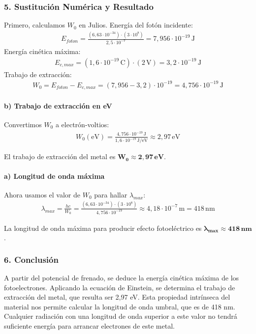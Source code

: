 \subsubsection*{5. Sustitución Numérica y Resultado}
Primero, calculamos $W_0$ en Julios.
Energía del fotón incidente:
\begin{gather}
    E_{foton} = \frac{(6,63 \cdot 10^{-34}) \cdot (3 \cdot 10^8)}{2,5 \cdot 10^{-7}} = 7,956 \cdot 10^{-19} \, \text{J}
\end{gather}
Energía cinética máxima:
\begin{gather}
    E_{c,max} = (1,6 \cdot 10^{-19} \, \text{C}) \cdot (2 \, \text{V}) = 3,2 \cdot 10^{-19} \, \text{J}
\end{gather}
Trabajo de extracción:
\begin{gather}
    W_0 = E_{foton} - E_{c,max} = (7,956 - 3,2) \cdot 10^{-19} = 4,756 \cdot 10^{-19} \, \text{J}
\end{gather}
\paragraph*{b) Trabajo de extracción en eV}
Convertimos $W_0$ a electrón-voltios:
\begin{gather}
    W_0 (\text{eV}) = \frac{4,756 \cdot 10^{-19} \, \text{J}}{1,6 \cdot 10^{-19} \, \text{J/eV}} \approx 2,97 \, \text{eV}
\end{gather}
\begin{cajaresultado}
    El trabajo de extracción del metal es $\boldsymbol{W_0 \approx 2,97 \, \textbf{eV}}$.
\end{cajaresultado}
\paragraph*{a) Longitud de onda máxima}
Ahora usamos el valor de $W_0$ para hallar $\lambda_{max}$:
\begin{gather}
    \lambda_{max} = \frac{hc}{W_0} = \frac{(6,63 \cdot 10^{-34}) \cdot (3 \cdot 10^8)}{4,756 \cdot 10^{-19}} \approx 4,18 \cdot 10^{-7} \, \text{m} = 418 \, \text{nm}
\end{gather}
\begin{cajaresultado}
    La longitud de onda máxima para producir efecto fotoeléctrico es $\boldsymbol{\lambda_{max} \approx 418 \, \textbf{nm}}$.
\end{cajaresultado}

\subsubsection*{6. Conclusión}
\begin{cajaconclusion}
A partir del potencial de frenado, se deduce la energía cinética máxima de los fotoelectrones. Aplicando la ecuación de Einstein, se determina el trabajo de extracción del metal, que resulta ser 2,97 eV. Esta propiedad intrínseca del material nos permite calcular la longitud de onda umbral, que es de 418 nm. Cualquier radiación con una longitud de onda superior a este valor no tendrá suficiente energía para arrancar electrones de este metal.
\end{cajaconclusion}

